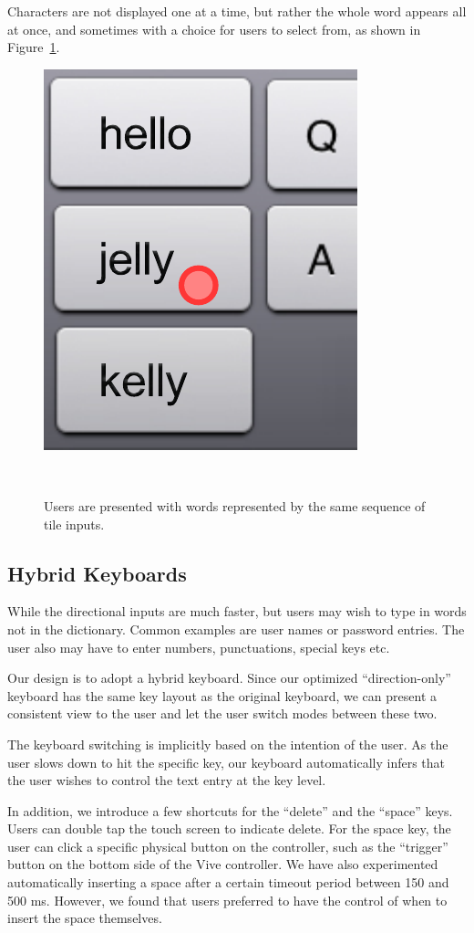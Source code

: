Characters are not displayed one at a time, but rather the whole word appears all at once, and sometimes with a choice for users to select from, as shown in Figure~\ref{fig:multiword}.


\begin{figure}
  \centering

  \includegraphics[width=.3\columnwidth]{figures/multiword}
  
  \caption{Users are presented with words represented by the same sequence of tile inputs.}
  ~\label{fig:multiword}
\end{figure}

\subsection{Hybrid Keyboards}

While the directional inputs are much faster, but users may wish to type in words not in the dictionary.  Common examples are user names or password entries.  The user also may have to enter numbers, punctuations, special keys etc. 

Our design is to adopt a hybrid keyboard.  Since our optimized “direction-only” keyboard has the same key layout as the original keyboard, we can present a consistent view to the user and let the user switch modes between these two.  

The keyboard switching is implicitly based on the intention of the user.  As the user slows down to hit the specific key, our keyboard automatically infers that the user wishes to control the text entry at the key level. 

In addition, we introduce a few shortcuts for the “delete” and the “space” keys.   Users can double tap the touch screen to indicate delete.  For the space key, the user can click a specific physical button on the controller, such as the “trigger” button on the bottom side of the Vive controller.  We have also experimented automatically inserting a space after a certain timeout period between 150 and 500 ms.  However, we found that users preferred to have the control of when to insert the space themselves.   

